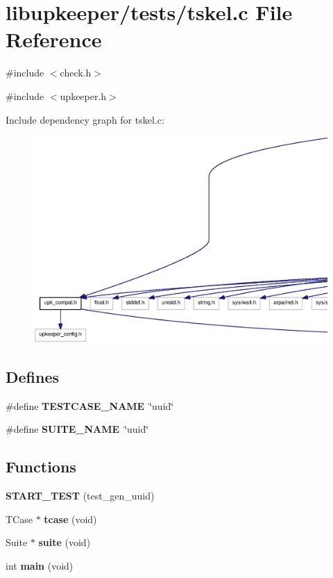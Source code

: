 \section{libupkeeper/tests/tskel.c File Reference}
\label{tskel_8c}
{\ttfamily \#include $<$check.h$>$}\par
{\ttfamily \#include $<$upkeeper.h$>$}\par
Include dependency graph for tskel.c:
\nopagebreak
\begin{figure}[H]
\begin{center}
\leavevmode
\includegraphics[width=400pt]{tskel_8c__incl}
\end{center}
\end{figure}
\subsection*{Defines}
\begin{DoxyCompactItemize}
\item 
\#define {\bf TESTCASE\_\-NAME}~\char`\"{}uuid\char`\"{}
\item 
\#define {\bf SUITE\_\-NAME}~\char`\"{}uuid\char`\"{}
\end{DoxyCompactItemize}
\subsection*{Functions}
\begin{DoxyCompactItemize}
\item 
{\bf START\_\-TEST} (test\_\-gen\_\-uuid)
\item 
TCase $\ast$ {\bf tcase} (void)
\item 
Suite $\ast$ {\bf suite} (void)
\item 
int {\bf main} (void)
\end{DoxyCompactItemize}
